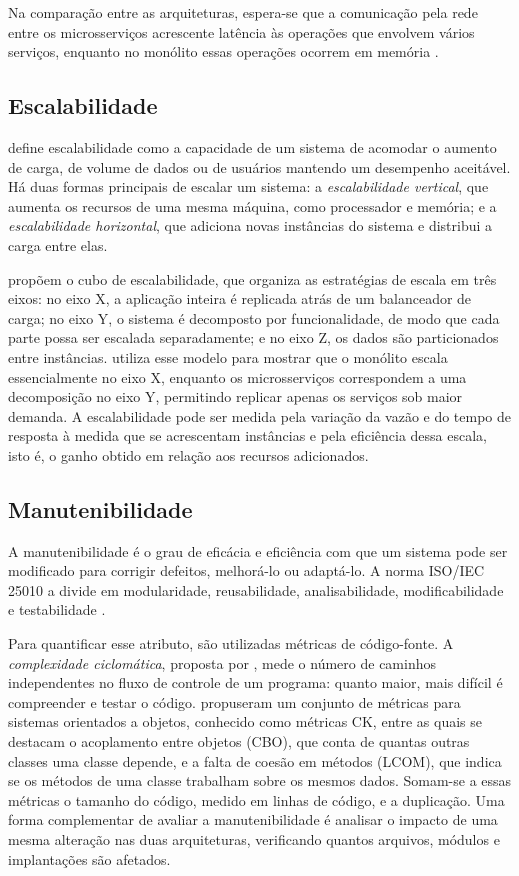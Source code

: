 Na comparação entre as arquiteturas, espera-se que a comunicação pela rede entre os
microsserviços acrescente latência às operações que envolvem vários serviços, enquanto no
monólito essas operações ocorrem em memória \cite{richards2024}.

\subsection{Escalabilidade}

 define escalabilidade como a capacidade de um sistema de acomodar o
aumento de carga, de volume de dados ou de usuários mantendo um desempenho aceitável. Há duas
formas principais de escalar um sistema: a \textit{escalabilidade vertical}, que aumenta os
recursos de uma mesma máquina, como processador e memória; e a \textit{escalabilidade
horizontal}, que adiciona novas instâncias do sistema e distribui a carga entre elas.

 propõem o cubo de escalabilidade, que organiza as estratégias de
escala em três eixos: no eixo X, a aplicação inteira é replicada atrás de um balanceador de
carga; no eixo Y, o sistema é decomposto por funcionalidade, de modo que cada parte possa ser
escalada separadamente; e no eixo Z, os dados são particionados entre instâncias.
 utiliza esse modelo para mostrar que o monólito escala
essencialmente no eixo X, enquanto os microsserviços correspondem a uma decomposição no eixo
Y, permitindo replicar apenas os serviços sob maior demanda. A escalabilidade pode ser medida
pela variação da vazão e do tempo de resposta à medida que se acrescentam instâncias e pela
eficiência dessa escala, isto é, o ganho obtido em relação aos recursos adicionados.

\subsection{Manutenibilidade}

A manutenibilidade é o grau de eficácia e eficiência com que um sistema pode ser modificado
para corrigir defeitos, melhorá-lo ou adaptá-lo. A norma ISO/IEC 25010 a divide em
modularidade, reusabilidade, analisabilidade, modificabilidade e testabilidade
\cite{iso25010}.

Para quantificar esse atributo, são utilizadas métricas de código-fonte. A
\textit{complexidade ciclomática}, proposta por , mede o número de
caminhos independentes no fluxo de controle de um programa: quanto maior, mais difícil é
compreender e testar o código.  propuseram um conjunto de métricas
para sistemas orientados a objetos, conhecido como métricas CK, entre as quais se destacam o
acoplamento entre objetos (CBO), que conta de quantas outras classes uma classe depende, e a
falta de coesão em métodos (LCOM), que indica se os métodos de uma classe trabalham sobre os
mesmos dados. Somam-se a essas métricas o tamanho do código, medido em linhas de código, e a
duplicação. Uma forma complementar de avaliar a manutenibilidade é analisar o impacto de uma
mesma alteração nas duas arquiteturas, verificando quantos arquivos, módulos e implantações
são afetados.

